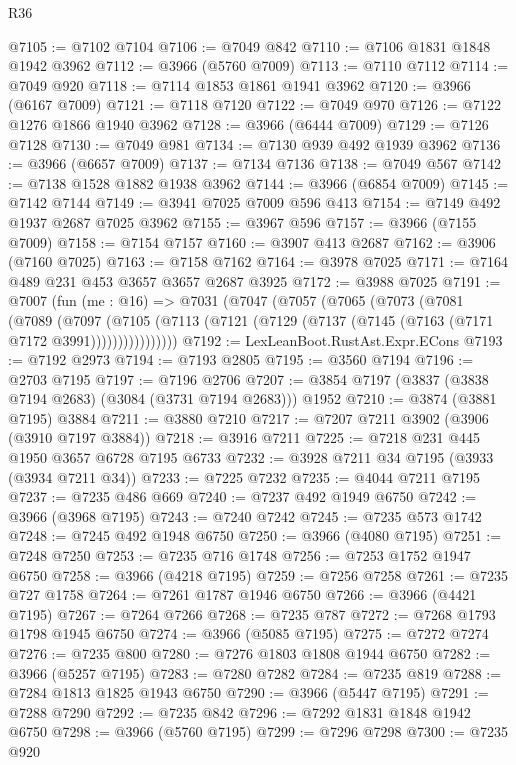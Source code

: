 \begin{lexlean}{R36}
\begin{coremodule}
@7105 := @7102 @7104
@7106 := @7049 @842
@7110 := @7106 @1831 @1848 @1942 @3962
@7112 := @3966 (@5760 @7009)
@7113 := @7110 @7112
@7114 := @7049 @920
@7118 := @7114 @1853 @1861 @1941 @3962
@7120 := @3966 (@6167 @7009)
@7121 := @7118 @7120
@7122 := @7049 @970
@7126 := @7122 @1276 @1866 @1940 @3962
@7128 := @3966 (@6444 @7009)
@7129 := @7126 @7128
@7130 := @7049 @981
@7134 := @7130 @939 @492 @1939 @3962
@7136 := @3966 (@6657 @7009)
@7137 := @7134 @7136
@7138 := @7049 @567
@7142 := @7138 @1528 @1882 @1938 @3962
@7144 := @3966 (@6854 @7009)
@7145 := @7142 @7144
@7149 := @3941 @7025 @7009 @596 @413
@7154 := @7149 @492 @1937 @2687 @7025 @3962
@7155 := @3967 @596
@7157 := @3966 (@7155 @7009)
@7158 := @7154 @7157
@7160 := @3907 @413 @2687
@7162 := @3906 (@7160 @7025)
@7163 := @7158 @7162
@7164 := @3978 @7025
@7171 := @7164 @489 @231 @453 @3657 @3657 @2687 @3925
@7172 := @3988 @7025
@7191 := @7007
    (fun (me : @16) =>
    @7031
      (@7047
        (@7057
          (@7065
            (@7073
              (@7081
                (@7089
                  (@7097
                    (@7105
                      (@7113 (@7121 (@7129 (@7137 (@7145 (@7163 (@7171 @7172 @3991))))))))))))))))
@7192 := LexLeanBoot.RustAst.Expr.ECons
@7193 := @7192 @2973
@7194 := @7193 @2805
@7195 := @3560 @7194
@7196 := @2703 @7195
@7197 := @7196 @2706
@7207 := @3854 @7197 (@3837 (@3838 @7194 @2683) (@3084 (@3731 @7194 @2683))) @1952
@7210 := @3874 (@3881 @7195) @3884
@7211 := @3880 @7210
@7217 := @7207 @7211 @3902 (@3906 (@3910 @7197 @3884))
@7218 := @3916 @7211
@7225 := @7218 @231 @445 @1950 @3657 @6728 @7195 @6733
@7232 := @3928 @7211 @34 @7195 (@3933 (@3934 @7211 @34))
@7233 := @7225 @7232
@7235 := @4044 @7211 @7195
@7237 := @7235 @486 @669
@7240 := @7237 @492 @1949 @6750
@7242 := @3966 (@3968 @7195)
@7243 := @7240 @7242
@7245 := @7235 @573 @1742
@7248 := @7245 @492 @1948 @6750
@7250 := @3966 (@4080 @7195)
@7251 := @7248 @7250
@7253 := @7235 @716 @1748
@7256 := @7253 @1752 @1947 @6750
@7258 := @3966 (@4218 @7195)
@7259 := @7256 @7258
@7261 := @7235 @727 @1758
@7264 := @7261 @1787 @1946 @6750
@7266 := @3966 (@4421 @7195)
@7267 := @7264 @7266
@7268 := @7235 @787
@7272 := @7268 @1793 @1798 @1945 @6750
@7274 := @3966 (@5085 @7195)
@7275 := @7272 @7274
@7276 := @7235 @800
@7280 := @7276 @1803 @1808 @1944 @6750
@7282 := @3966 (@5257 @7195)
@7283 := @7280 @7282
@7284 := @7235 @819
@7288 := @7284 @1813 @1825 @1943 @6750
@7290 := @3966 (@5447 @7195)
@7291 := @7288 @7290
@7292 := @7235 @842
@7296 := @7292 @1831 @1848 @1942 @6750
@7298 := @3966 (@5760 @7195)
@7299 := @7296 @7298
@7300 := @7235 @920

\end{coremodule}
\end{lexlean}
